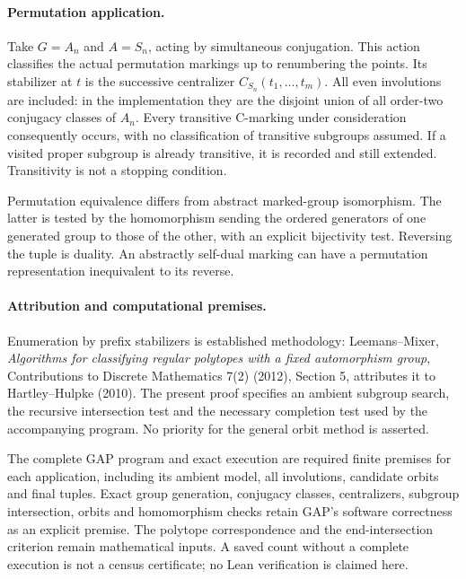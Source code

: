 \documentclass[11pt,a4paper]{article}
\begin{document}
\paragraph{Permutation application.}
Take $G=A_n$ and $A=S_n$, acting by simultaneous conjugation.
This action classifies the actual permutation markings up to
renumbering the points. Its stabilizer at $t$ is the successive
centralizer $C_{S_n}(t_1,\ldots,t_m)$. All even involutions are
included: in the implementation they are the disjoint union of
all order-two conjugacy classes of $A_n$. Every transitive
C-marking under consideration consequently occurs, with no
classification of transitive subgroups assumed. If a visited
proper subgroup is already transitive, it is recorded and still
extended. Transitivity is not a stopping condition.

Permutation equivalence differs from abstract marked-group
isomorphism. The latter is tested by the homomorphism sending
the ordered generators of one generated group to those of the
other, with an explicit bijectivity test. Reversing the tuple
is duality. An abstractly self-dual marking can have a permutation
representation inequivalent to its reverse.

\paragraph{Attribution and computational premises.}
Enumeration by prefix stabilizers is established methodology:
Leemans--Mixer, \emph{Algorithms for classifying regular polytopes
with a fixed automorphism group}, Contributions to Discrete
Mathematics 7(2) (2012), Section 5, attributes it to Hartley--Hulpke
(2010). The present proof specifies an ambient subgroup search,
the recursive intersection test and the necessary completion
test used by the accompanying program. No priority for the
general orbit method is asserted.

The complete GAP program and exact execution are required finite
premises for each application, including its ambient model,
all involutions, candidate orbits and final tuples. Exact group
generation, conjugacy classes, centralizers, subgroup intersection,
orbits and homomorphism checks retain GAP's software correctness
as an explicit premise. The polytope correspondence and the
end-intersection criterion remain mathematical inputs. A saved
count without a complete execution is not a census certificate;
no Lean verification is claimed here.
\end{document}
